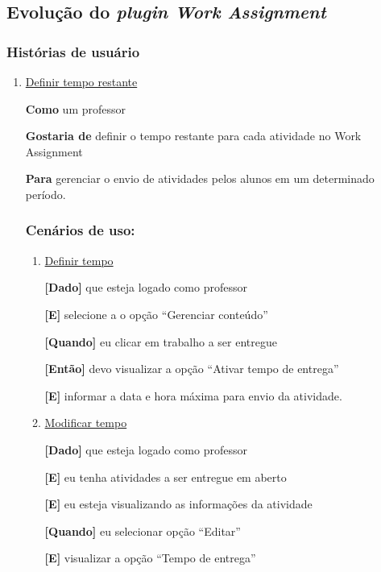\subsection{Evolução do \textit{plugin Work Assignment}}

\subsubsection*{Histórias de usuário}

\begin{enumerate}
\item \underline{Definir tempo restante}

\textbf{Como} um professor

\textbf{Gostaria de} definir o tempo restante para cada atividade no Work Assignment

\textbf{Para} gerenciar o envio de atividades pelos alunos em um determinado período.

\subsubsection*{Cenários de uso:}

\begin{enumerate}
\item \underline{Definir tempo}

\textbf{[Dado]} que esteja logado como professor

\textbf{[E]} selecione a o opção ``Gerenciar conteúdo''

\textbf{[Quando]} eu clicar em trabalho a ser entregue

\textbf{[Então]} devo visualizar a opção ``Ativar tempo de entrega''

\textbf{[E]} informar a data e hora máxima para envio da atividade.

\item \underline{Modificar tempo}

\textbf{[Dado]} que esteja logado como professor

\textbf{[E]} eu tenha atividades a ser entregue em aberto

\textbf{[E]} eu esteja visualizando as informações da atividade

\textbf{[Quando]} eu selecionar opção ``Editar''

\textbf{[E]} visualizar a opção ``Tempo de entrega''


\end{enumerate}
\end{enumerate}
